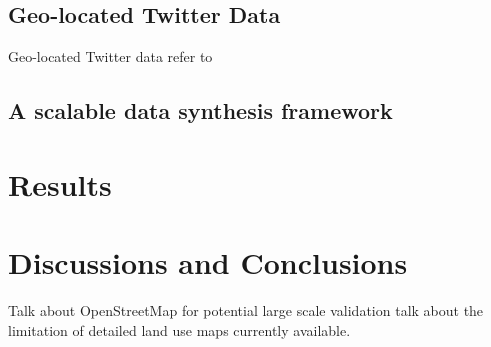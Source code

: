 \documentclass[a4paper,11pt]{article}
\begin{document}
\subsection{Geo-located Twitter Data}
Geo-located Twitter data refer to  


\subsection{A scalable data synthesis framework}



\section{Results}


\section{Discussions and Conclusions}
Talk about OpenStreetMap for potential large scale validation
talk about the limitation of detailed land use maps currently available.





\end{document}

